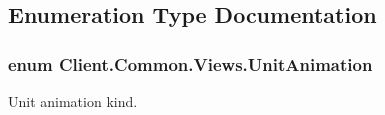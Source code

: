 \subsection{Enumeration Type Documentation}
\hypertarget{namespaceClient_1_1Common_1_1Views_a6974b9f5798be7fa135e7517fa41ffe0}{}
\subsubsection[{Unit\+Animation}]{\setlength{\rightskip}{0pt plus 5cm}enum {\bf Client.\+Common.\+Views.\+Unit\+Animation}\hspace{0.3cm}{\ttfamily [strong]}}\label{namespaceClient_1_1Common_1_1Views_a6974b9f5798be7fa135e7517fa41ffe0}


Unit animation kind. 

